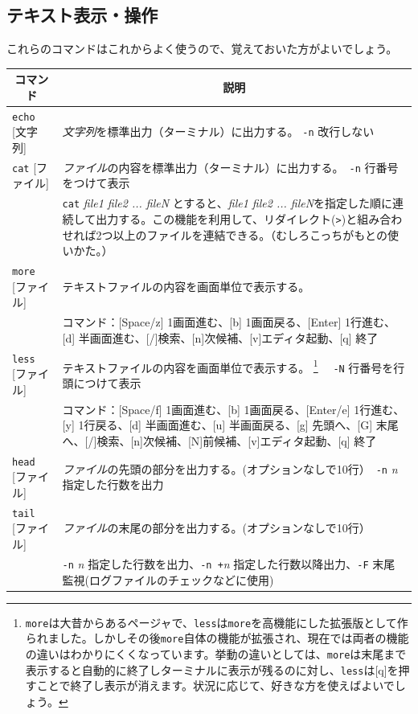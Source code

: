 \documentclass[a4j]{ltjreport}
\newcommand{\cn}[1]{\multirow{2}{*}{#1}}
\begin{document}
    \subsection{テキスト表示・操作}
    これらのコマンドはこれからよく使うので、覚えておいた方がよいでしょう。
    \begin{longtable}[c]{|p{3.5cm}|p{13.5cm}|}
        \hline
        \multicolumn{1}{|c|}{\textbf{コマンド}}&\multicolumn{1}{|c|}{\textbf{説明}}\\
        \hline\hline
        \texttt{echo} [文字列] &\emph{文字列}を標準出力（ターミナル）に出力する。 \texttt{-n} 改行しない\\
        \hline
        \texttt{cat} [ファイル] &\emph{ファイル}の内容を標準出力（ターミナル）に出力する。\ \texttt{-n} 行番号をつけて表示 \\
        &\texttt{cat} \textit{file1 file2 ... fileN} とすると、\textit{file1 file2 ... fileN}を指定した順に連続して出力する。この機能を利用して、リダイレクト(\verb|>|)と組み合わせれば2つ以上のファイルを連結できる。（むしろこっちがもとの使いかた。）\\
        \hline
        \texttt{more} [ファイル] &テキストファイルの内容を画面単位で表示する。\\
        &コマンド：[Space/z] 1画面進む、[b] 1画面戻る、[Enter] 1行進む、[d] 半画面進む、[/]検索、[n]次候補、[v]エディタ起動、[q] 終了\\
        \hline
        \texttt{less} [ファイル] &テキストファイルの内容を画面単位で表示する。
        \footnote{\texttt{more}は大昔からあるページャで、\texttt{less}は\texttt{more}を高機能にした拡張版として作られました。しかしその後\texttt{more}自体の機能が拡張され、現在では両者の機能の違いはわかりにくくなっています。挙動の違いとしては、\texttt{more}は末尾まで表示すると自動的に終了しターミナルに表示が残るのに対し、\texttt{less}は[q]を押すことで終了し表示が消えます。状況に応じて、好きな方を使えばよいでしょう。} 
        \ \ \texttt{-N} 行番号を行頭につけて表示\\
        &コマンド：[Space/f] 1画面進む、[b] 1画面戻る、[Enter/e] 1行進む、[y] 1行戻る、[d] 半画面進む、[u] 半画面戻る、[g] 先頭へ、[G] 末尾へ、[/]検索、[n]次候補、[N]前候補、[v]エディタ起動、[q] 終了\\
        \hline

        \texttt{head} [ファイル] &\emph{ファイル}の先頭の部分を出力する。(オプションなしで10行）\ \texttt{-n} \textit{n} 指定した行数を出力\\
        \hline
        \texttt{tail} [ファイル] &\emph{ファイル}の末尾の部分を出力する。(オプションなしで10行）\\
        &\texttt{-n} \textit{n} 指定した行数を出力、\texttt{-n +}\textit{n} 指定した行数以降出力、\texttt{-F} 末尾監視(ログファイルのチェックなどに使用)\\
        \hline


\end{longtable}
\end{document}
